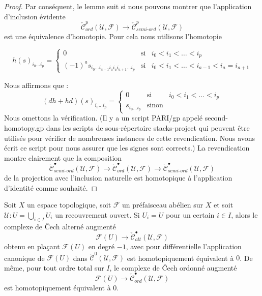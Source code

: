 \begin{proof}
\medskip\noindent

Par conséquent, le lemme suit si nous pouvons montrer que l'application d'inclusion évidente
$$
\check{\mathcal{C}}_{ord}^p(\mathcal{U}, \mathcal{F})
\longrightarrow
\check{\mathcal{C}}_{semi\text{-}ord}^p(\mathcal{U}, \mathcal{F})
$$
est une équivalence d'homotopie. Pour cela nous utilisons l'homotopie

\begin{equation}
\label{equation-second-homotopy}
h(s)_{i_0 \ldots i_p} =
\left\{
\begin{matrix}
0 & \text{si} & i_0 < i_1 < \ldots < i_p \\
(-1)^a s_{i_0 \ldots i_{a - 1} i_a i_a i_{a + 1} \ldots i_p}
& \text{si} & i_0 < i_1 < \ldots < i_{a - 1} < i_a = i_{a + 1}
\end{matrix}
\right.
\end{equation}

Nous affirmons que :
$$
(dh + hd)(s)_{i_0 \ldots i_p} =
\left\{
\begin{matrix}
0 & \text{si} & i_0 < i_1 < \ldots < i_p \\
s_{i_0 \ldots i_p}
& \text{sinon} &
\end{matrix}
\right.
$$
Nous omettons la vérification. (Il y a un script PARI/gp appelé second-homotopy.gp dans les scripts de sous-répertoire stacks-project qui peuvent être utilisés pour vérifier de nombreuses instances de cette revendication. Nous avons écrit ce script pour nous assurer que les signes sont corrects.) La revendication montre clairement que la composition
$$
\check{\mathcal{C}}_{semi\text{-}ord}^\bullet(\mathcal{U}, \mathcal{F})
\longrightarrow
\check{\mathcal{C}}_{ord}^\bullet(\mathcal{U}, \mathcal{F})
\longrightarrow
\check{\mathcal{C}}_{semi\text{-}ord}^\bullet(\mathcal{U}, \mathcal{F})
$$
de la projection avec l'inclusion naturelle est homotopique à l'application d'identité comme souhaité.

\end{proof}

\begin{lemma}

\label{lemma-alternating-cech-trivial}

Soit $X$ un espace topologique, soit $\mathcal{F}$ un préfaisceau abélien sur $X$ et soit $\mathcal{U} : U = \bigcup_{i \in I} U_i$ un recouvrement ouvert. Si
$U_i = U$ pour un certain $i \in I$, alors le complexe de {\v C}ech alterné augmenté
$$
\mathcal{F}(U) \to \check{\mathcal{C}}_{alt}^\bullet(\mathcal{U}, \mathcal{F})
$$
obtenu en plaçant $\mathcal{F}(U)$ en degré $-1$, avec pour différentielle l'application canonique de $\mathcal{F}(U)$ dans
$\check{\mathcal{C}}^0(\mathcal{U}, \mathcal{F})$
est homotopiquement équivalent à $0$. De même, pour tout ordre total sur $I$,
le complexe de {\v C}ech ordonné augmenté
$$
\mathcal{F}(U) \to
\check{\mathcal{C}}_{ord}^\bullet(\mathcal{U}, \mathcal{F})
$$
est homotopiquement équivalent à $0$.

\end{lemma}

